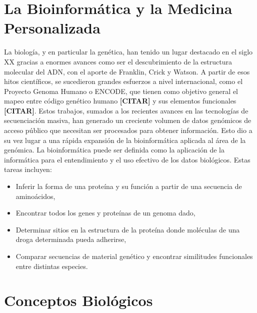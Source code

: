\section{La Bioinformática y la Medicina Personalizada}

La biología, y en particular la genética, han tenido un lugar destacado en el siglo XX gracias a enormes avances como ser el descubrimiento de la estructura molecular del ADN, con el aporte de Franklin, Crick y Watson. A partir de esos hitos científicos, se sucedieron grandes esfuerzos a nivel internacional, como el Proyecto Genoma Humano o ENCODE, que tienen como objetivo general el mapeo entre código genético humano \textbf{[CITAR]} y sus elementos funcionales \textbf{[CITAR]}. Estos trabajos, sumados a los recientes avances en las tecnologías de secuenciación masiva, han generado un creciente volumen de datos genómicos de acceso público que necesitan ser procesados para obtener información. Esto dio a su vez lugar a una rápida expansión de la bioinformática aplicada al área de la genómica. La bioinformática puede ser definida como la aplicación de la informática para el entendimiento y el uso efectivo de los datos biológicos. Estas tareas incluyen:

\begin{itemize}
    \setlength\itemsep{0.2em}
    \item Inferir la forma de una proteína y su función a partir de una secuencia de aminoácidos,
    \item Encontrar todos los genes y proteínas de un genoma dado,
    \item Determinar sitios en la estructura de la proteína donde moléculas de una droga determinada pueda adherirse,
    \item Comparar secuencias de material genético y encontrar similitudes funcionales entre distintas especies.
\end{itemize}


\section{Conceptos Biológicos}

